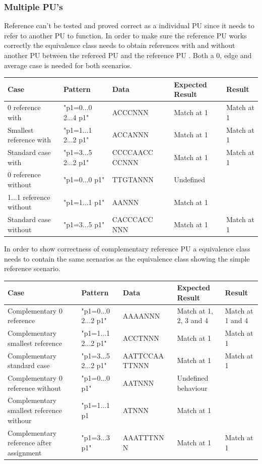 \documentclass[12pt]{article}
\newcommand{\textapprox}{\raisebox{0.5ex}{\texttildelow}}
\newcommand{\pu}{PU }
\newcommand{\pus}{PU's }
\begin{document}
\subsubsection{Multiple \pus}


Reference can't be tested and proved correct as a individual \pu since it needs to refer to another \pu
to function. 
In order to make sure the reference \pu works correctly the equivalence class needs to obtain references with and
without another \pu between the refereed \pu and the reference \pu. Both a 0, edge and average case is needed for both
scenarios.
\begin{table}[H]
\begin{tabular}{p{4cm}|p{3cm}|p{2.5cm}|p{2.5cm}|p{2.5cm}}
Case 			& Pattern & Data & Expected Result & Result \\ \hline
0 reference with 	& "p1=0...0 2...4 p1" & ACCCNNN & Match at 1 & Match at 1 \\ \hline
Smallest reference with 	& "p1=1...1 2...2 p1" & ACCANNN & Match at 1 & Match at 1 \\ \hline
Standard case with	& "p1=3...5 2...2 p1" & CCCCAACC CCNNN & Match at 1 & Match at 1\\ \hline
0 reference without	& "p1=0...0 p1" & TTGTANNN & Undefined & \\ \hline
1...1 reference without & "p1=1...1 p1" & AANNN & Match at 1 & \\ \hline
Standard case without & "p1=3...5 p1" & CACCCACC NNN & Match at 1 & Match at 1\\ \hline
\end{tabular}
\end{table}

In order to show correctness of complementary reference \pu a equivalence class needs to contain the same scenarios
as the equivalence class showing the simple reference scenario.
\begin{table}[H]
\begin{tabular}{p{4cm}|p{3cm}|p{2.5cm}|p{2.5cm}|p{2.5cm}}
Case 			& Pattern & Data & Expected Result & Result \\ \hline
Complementary 0 reference & "p1=0...0 2...2 \textapprox p1" & AAAANNN & Match at 1, 2, 3 and 4 & Match at 1 and 4\\ \hline
Complementary smallest reference & "p1=1...1 2...2 \textapprox p1" & ACCTNNN & Match at 1 & Match at 1\\ \hline
Complementary standard case & "p1=3...5 2...2 \textapprox p1" & AATTCCAA TTNNN & Match at 1 & Match at 1\\ \hline
Complementary 0 reference without & "p1=0...0 \textapprox p1" & AATNNN & Undefined behaviour & \\ \hline
Complementary smallest reference withour & "p1=1...1 \textapprox p1 & ATNNN & Match at 1 & \\ \hline 
Complementary reference after assignment & "p1=3...3 \textapprox p1" & AAATTTNN N & Match at 1 & Match at 1\\ \hline
\end{tabular}
\end{table}
\end{document}
